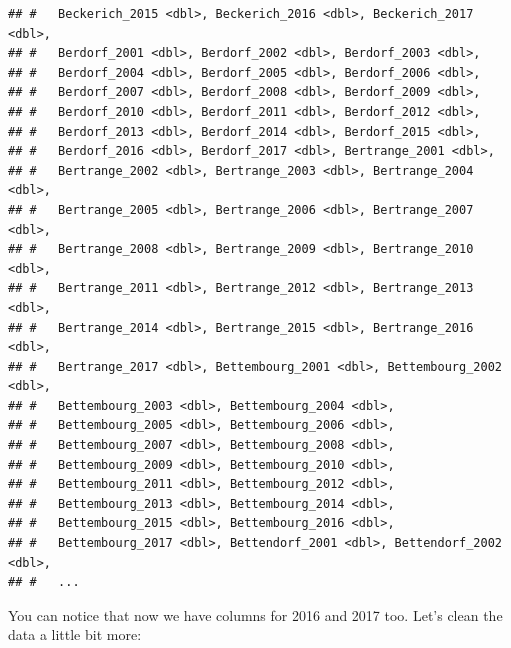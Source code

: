 \documentclass[]{gitbook}
\newenvironment{Shaded}{\begin{snugshade}}{\end{snugshade}}
\newcommand{\DataTypeTok}[1]{\textcolor[rgb]{0.13,0.29,0.53}{#1}}
\newcommand{\KeywordTok}[1]{\textcolor[rgb]{0.13,0.29,0.53}{\textbf{#1}}}
\newcommand{\NormalTok}[1]{#1}
\newcommand{\OperatorTok}[1]{\textcolor[rgb]{0.81,0.36,0.00}{\textbf{#1}}}
\newcommand{\StringTok}[1]{\textcolor[rgb]{0.31,0.60,0.02}{#1}}
\begin{document}
\begin{verbatim}
## #   Beckerich_2015 <dbl>, Beckerich_2016 <dbl>, Beckerich_2017 <dbl>,
## #   Berdorf_2001 <dbl>, Berdorf_2002 <dbl>, Berdorf_2003 <dbl>,
## #   Berdorf_2004 <dbl>, Berdorf_2005 <dbl>, Berdorf_2006 <dbl>,
## #   Berdorf_2007 <dbl>, Berdorf_2008 <dbl>, Berdorf_2009 <dbl>,
## #   Berdorf_2010 <dbl>, Berdorf_2011 <dbl>, Berdorf_2012 <dbl>,
## #   Berdorf_2013 <dbl>, Berdorf_2014 <dbl>, Berdorf_2015 <dbl>,
## #   Berdorf_2016 <dbl>, Berdorf_2017 <dbl>, Bertrange_2001 <dbl>,
## #   Bertrange_2002 <dbl>, Bertrange_2003 <dbl>, Bertrange_2004 <dbl>,
## #   Bertrange_2005 <dbl>, Bertrange_2006 <dbl>, Bertrange_2007 <dbl>,
## #   Bertrange_2008 <dbl>, Bertrange_2009 <dbl>, Bertrange_2010 <dbl>,
## #   Bertrange_2011 <dbl>, Bertrange_2012 <dbl>, Bertrange_2013 <dbl>,
## #   Bertrange_2014 <dbl>, Bertrange_2015 <dbl>, Bertrange_2016 <dbl>,
## #   Bertrange_2017 <dbl>, Bettembourg_2001 <dbl>, Bettembourg_2002 <dbl>,
## #   Bettembourg_2003 <dbl>, Bettembourg_2004 <dbl>,
## #   Bettembourg_2005 <dbl>, Bettembourg_2006 <dbl>,
## #   Bettembourg_2007 <dbl>, Bettembourg_2008 <dbl>,
## #   Bettembourg_2009 <dbl>, Bettembourg_2010 <dbl>,
## #   Bettembourg_2011 <dbl>, Bettembourg_2012 <dbl>,
## #   Bettembourg_2013 <dbl>, Bettembourg_2014 <dbl>,
## #   Bettembourg_2015 <dbl>, Bettembourg_2016 <dbl>,
## #   Bettembourg_2017 <dbl>, Bettendorf_2001 <dbl>, Bettendorf_2002 <dbl>,
## #   ...
\end{verbatim}

You can notice that now we have columns for 2016 and 2017 too. Let's clean the data a little bit more:

\begin{Shaded}
\end{Shaded}
\end{document}
